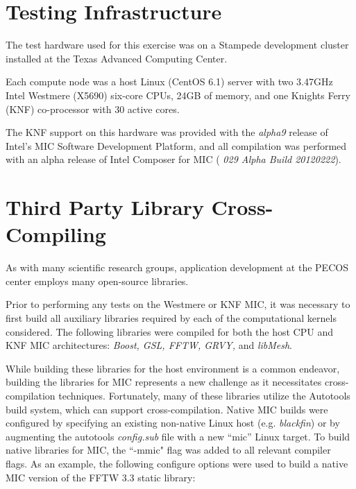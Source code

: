 \section{Testing Infrastructure}
\label{sec:hardware}

The test hardware used for this exercise was
on a Stampede development cluster installed at the Texas Advanced
Computing Center.

Each compute node was a host Linux (CentOS 6.1)
server with two 3.47GHz Intel Westmere (X5690) six-core CPUs, 24GB of
memory, and one Knights Ferry (KNF) co-processor with 30 active
cores.

The KNF support on this hardware
was provided with the {\em alpha9} release of Intel's MIC Software
Development Platform, and all compilation was performed with an alpha
release of Intel Composer for MIC ({\em 
  029 Alpha Build 20120222}).

\section{Third Party Library Cross-Compiling} \label{sec:cross_compile}

As with many scientific research groups, application development at
the PECOS center employs many open-source libraries.

Prior to
performing any tests on the Westmere or KNF MIC, it was necessary to
first build all auxiliary libraries required by each of the
computational kernels considered.
The following libraries were
compiled for both the host CPU and KNF MIC architectures: {\em Boost,
GSL, FFTW\cite{FFTW05}, GRVY,} and
{\em libMesh}.

While building these libraries for the host environment is
a common endeavor, building the libraries for MIC
represents a new challenge as it necessitates cross-compilation
techniques.
Fortunately, many of these libraries utilize the
Autotools build system, which can support cross-compilation.
Native MIC builds were configured by
specifying an existing non-native Linux host
(e.g. {\em blackfin}) or by augmenting the autotools {\em config.sub}
file with a new ``mic'' Linux target.
To build native libraries for MIC, the ``-mmic"
flag was added to all relevant compiler flags.
As an example, the following configure options were used to build a
native MIC version of the FFTW 3.3 static library:

